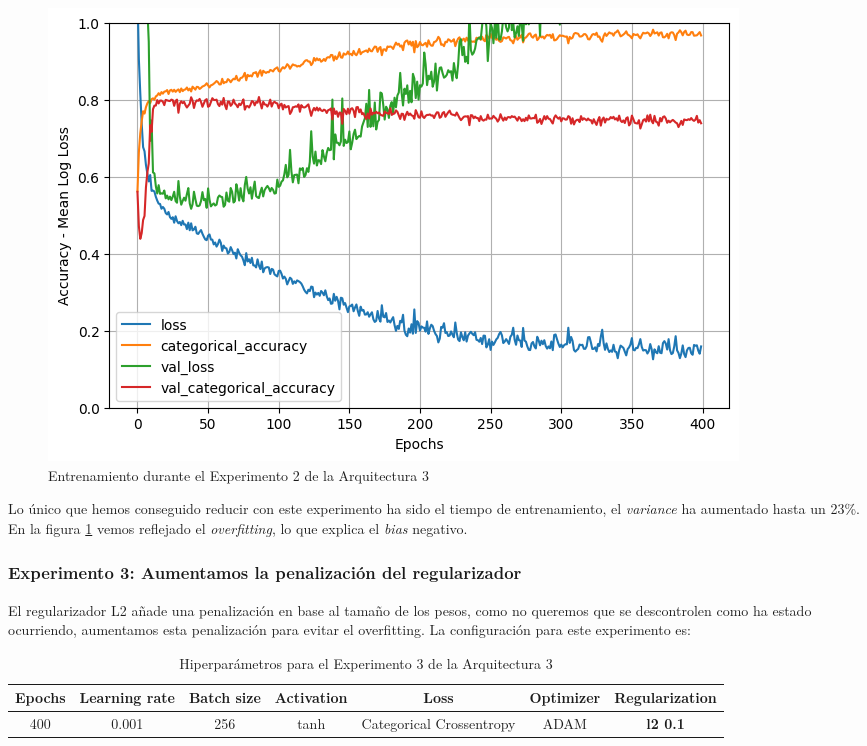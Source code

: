 \documentclass{article}
\begin{document}
			\begin{figure}[!h]
				\begin{center}
					\includegraphics[scale=0.4]{d-tr-a3-e2.png}		
					\caption{Entrenamiento durante el Experimento 2 de la Arquitectura 3}	
					\label{d-tr-a3-e2}
				\end{center}
			\end{figure}
			Lo \'unico que hemos conseguido reducir con este experimento ha sido el tiempo de entrenamiento, el \textit{variance} ha aumentado hasta un 23\%.
			En la figura \ref{d-tr-a3-e2} vemos reflejado el \textit{overfitting}, lo que explica el \textit{bias} negativo.
			
		\subsubsection{Experimento 3: Aumentamos la penalizaci\'on del regularizador}
		\label{d-s-a3-e3}
			El regularizador L2 a\~nade una penalizaci\'on en base al tama\~no de los pesos, como no queremos que se descontrolen como ha estado ocurriendo, aumentamos esta penalizaci\'on para evitar el overfitting. La configuraci\'on para este experimento es:
			\begin{table}[!h]
				\begin{tabular}{| c | c | c | c | c | c | c |}
					\textbf{Epochs} & \textbf{Learning rate} & \textbf{Batch size} & \textbf{Activation} & \textbf{Loss} & \textbf{Optimizer} & \textbf{Regularization} \\ \hline
					400 & 0.001 & 256 & tanh & Categorical Crossentropy & ADAM & \textbf{l2 0.1}
				\end{tabular}
				\caption{Hiperpar\'ametros para el Experimento 3 de la Arquitectura 3}
				\label{tab:hip-d-a3-e3}
			\end{table}
			
\end{document}
